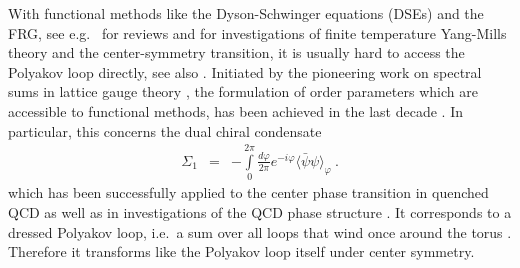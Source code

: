 \documentclass[final,twocolumn,merge,sort&compress]{elsarticle}
\begin{document}
With functional methods like the Dyson-Schwinger equations (DSEs) and
the FRG, see e.g.\ \cite{Alkofer:2000wg, Roberts:2000aa,
  Fischer:2006ub, Aguilar:2008xm, Fischer:2008uz,
  Binosi:2009qm, Maas:2011se, Boucaud:2011ug, Eichmann:2016yit,
  Litim:1998nf, Berges:2000ew, Pawlowski:2005xe, Gies:2006wv,
  Schaefer:2006sr, Rosten:2010vm, Braun:2011pp, vonSmekal:2012vx} for
reviews and \cite{Braun:2007bx, Marhauser:2008fz, Fischer:2009wc,
  Braun:2009gm,
  Fischer:2009gk,Fischer:2010fx,Fischer:2011mz,Fischer:2012vc,
  Fister:2013bh, Haas:2013qwp, Fischer:2013eca, Fischer:2014ata,
  Quandt:2015aaa, Reinosa:2016iml, Huber:2016xbs, Cyrol:2017qkl} for
investigations of finite temperature Yang-Mills theory and the
center-symmetry transition, it is usually hard to access the Polyakov
loop directly, see also \cite{Herbst:2015ona}. Initiated by the
pioneering work on spectral sums in lattice gauge theory
\cite{Gattringer:2006ci, Bruckmann:2006kx, Bilgici:2008qy}, the
formulation of order parameters which are accessible to functional
methods, has been achieved in the last decade \cite{Synatschke:2007bz,
  Synatschke:2008yt, Fischer:2009wc}.  In particular, this concerns
the dual chiral condensate \cite{Fischer:2009wc}
\begin{eqnarray}
\label{eq:dualcond}
 \Sigma_1 & = &
 -\int\limits_{0}^{2\pi}\frac{d\varphi}{2\pi}e^{-i\varphi} \langle
 \bar \psi \psi \rangle_\varphi\ .
\end{eqnarray}
which has been successfully applied to the center phase transition in
quenched QCD \cite{Fischer:2009wc, Fischer:2009gk, Fischer:2010fx} as
well as in investigations of the QCD phase structure
\cite{Braun:2009gm, Fischer:2011mz, Fischer:2012vc,
  Fischer:2014ata}. It corresponds to a dressed Polyakov loop, i.e.\ a
sum over all loops that wind once around the torus
\cite{Bilgici:2008qy}. Therefore it transforms like the Polyakov loop
itself under center symmetry.
\end{document}
